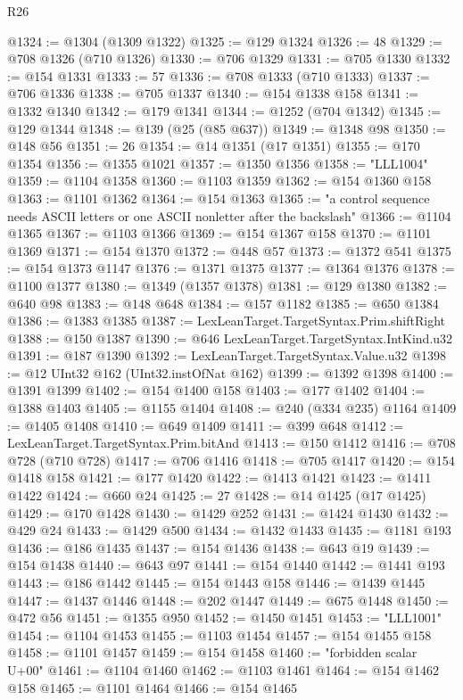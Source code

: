 \begin{lexlean}{R26}
\begin{coremodule}
@1324 := @1304 (@1309 @1322)
@1325 := @129 @1324
@1326 := 48
@1329 := @708 @1326 (@710 @1326)
@1330 := @706 @1329
@1331 := @705 @1330
@1332 := @154 @1331
@1333 := 57
@1336 := @708 @1333 (@710 @1333)
@1337 := @706 @1336
@1338 := @705 @1337
@1340 := @154 @1338 @158
@1341 := @1332 @1340
@1342 := @179 @1341
@1344 := @1252 (@704 @1342)
@1345 := @129 @1344
@1348 := @139 (@25 (@85 @637))
@1349 := @1348 @98
@1350 := @148 @56
@1351 := 26
@1354 := @14 @1351 (@17 @1351)
@1355 := @170 @1354
@1356 := @1355 @1021
@1357 := @1350 @1356
@1358 := "LLL1004"
@1359 := @1104 @1358
@1360 := @1103 @1359
@1362 := @154 @1360 @158
@1363 := @1101 @1362
@1364 := @154 @1363
@1365 := "a control sequence needs ASCII letters or one ASCII nonletter after the backslash"
@1366 := @1104 @1365
@1367 := @1103 @1366
@1369 := @154 @1367 @158
@1370 := @1101 @1369
@1371 := @154 @1370
@1372 := @448 @57
@1373 := @1372 @541
@1375 := @154 @1373 @1147
@1376 := @1371 @1375
@1377 := @1364 @1376
@1378 := @1100 @1377
@1380 := @1349 (@1357 @1378)
@1381 := @129 @1380
@1382 := @640 @98
@1383 := @148 @648
@1384 := @157 @1182
@1385 := @650 @1384
@1386 := @1383 @1385
@1387 := LexLeanTarget.TargetSyntax.Prim.shiftRight
@1388 := @150 @1387
@1390 := @646 LexLeanTarget.TargetSyntax.IntKind.u32
@1391 := @187 @1390
@1392 := LexLeanTarget.TargetSyntax.Value.u32
@1398 := @12 UInt32 @162 (UInt32.instOfNat @162)
@1399 := @1392 @1398
@1400 := @1391 @1399
@1402 := @154 @1400 @158
@1403 := @177 @1402
@1404 := @1388 @1403
@1405 := @1155 @1404
@1408 := @240 (@334 @235) @1164
@1409 := @1405 @1408
@1410 := @649 @1409
@1411 := @399 @648
@1412 := LexLeanTarget.TargetSyntax.Prim.bitAnd
@1413 := @150 @1412
@1416 := @708 @728 (@710 @728)
@1417 := @706 @1416
@1418 := @705 @1417
@1420 := @154 @1418 @158
@1421 := @177 @1420
@1422 := @1413 @1421
@1423 := @1411 @1422
@1424 := @660 @24
@1425 := 27
@1428 := @14 @1425 (@17 @1425)
@1429 := @170 @1428
@1430 := @1429 @252
@1431 := @1424 @1430
@1432 := @429 @24
@1433 := @1429 @500
@1434 := @1432 @1433
@1435 := @1181 @193
@1436 := @186 @1435
@1437 := @154 @1436
@1438 := @643 @19
@1439 := @154 @1438
@1440 := @643 @97
@1441 := @154 @1440
@1442 := @1441 @193
@1443 := @186 @1442
@1445 := @154 @1443 @158
@1446 := @1439 @1445
@1447 := @1437 @1446
@1448 := @202 @1447
@1449 := @675 @1448
@1450 := @472 @56
@1451 := @1355 @950
@1452 := @1450 @1451
@1453 := "LLL1001"
@1454 := @1104 @1453
@1455 := @1103 @1454
@1457 := @154 @1455 @158
@1458 := @1101 @1457
@1459 := @154 @1458
@1460 := "forbidden scalar U+00"
@1461 := @1104 @1460
@1462 := @1103 @1461
@1464 := @154 @1462 @158
@1465 := @1101 @1464
@1466 := @154 @1465

\end{coremodule}
\end{lexlean}
